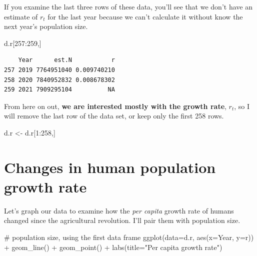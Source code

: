 \documentclass[
  letterpaper,
  DIV=11,
  numbers=noendperiod]{scrreprt}
\newenvironment{Shaded}{\begin{snugshade}}{\end{snugshade}}
\newcommand{\AttributeTok}[1]{\textcolor[rgb]{0.40,0.45,0.13}{#1}}
\newcommand{\CommentTok}[1]{\textcolor[rgb]{0.37,0.37,0.37}{#1}}
\newcommand{\DecValTok}[1]{\textcolor[rgb]{0.68,0.00,0.00}{#1}}
\newcommand{\FunctionTok}[1]{\textcolor[rgb]{0.28,0.35,0.67}{#1}}
\newcommand{\NormalTok}[1]{\textcolor[rgb]{0.00,0.23,0.31}{#1}}
\newcommand{\OtherTok}[1]{\textcolor[rgb]{0.00,0.23,0.31}{#1}}
\newcommand{\SpecialCharTok}[1]{\textcolor[rgb]{0.37,0.37,0.37}{#1}}
\newcommand{\StringTok}[1]{\textcolor[rgb]{0.13,0.47,0.30}{#1}}
\begin{document}
If you examine the last three rows of these data, you'll see that we
don't have an estimate of \(r_t\) for the last year because we can't
calculate it without know the next year's population size.

\begin{Shaded}
\begin{Highlighting}[]
\NormalTok{d.r[}\DecValTok{257}\SpecialCharTok{:}\DecValTok{259}\NormalTok{,]}
\end{Highlighting}
\end{Shaded}

\begin{verbatim}
    Year      est.N           r
257 2019 7764951040 0.009740210
258 2020 7840952832 0.008678302
259 2021 7909295104          NA
\end{verbatim}

From here on out, \textbf{we are interested mostly with the growth
rate}, \(r_t\), so I will remove the last row of the data set, or keep
only the first 258 rows.

\begin{Shaded}
\begin{Highlighting}[]
\NormalTok{d.r }\OtherTok{\textless{}{-}}\NormalTok{ d.r[}\DecValTok{1}\SpecialCharTok{:}\DecValTok{258}\NormalTok{,]}
\end{Highlighting}
\end{Shaded}

\section{Changes in human population growth
rate}\label{changes-in-human-population-growth-rate}

Let's graph our data to examine how the \emph{per capita} growth rate of
humans changed since the agricultural revolution. I'll pair them with
population size.

\begin{Shaded}
\begin{Highlighting}[]
\CommentTok{\# population size, using the first data frame}
\FunctionTok{ggplot}\NormalTok{(}\AttributeTok{data=}\NormalTok{d.r, }\FunctionTok{aes}\NormalTok{(}\AttributeTok{x=}\NormalTok{Year, }\AttributeTok{y=}\NormalTok{r)) }\SpecialCharTok{+} \FunctionTok{geom\_line}\NormalTok{() }\SpecialCharTok{+}
  \FunctionTok{geom\_point}\NormalTok{() }\SpecialCharTok{+} \FunctionTok{labs}\NormalTok{(}\AttributeTok{title=}\StringTok{"Per capita growth rate"}\NormalTok{)}
\end{Highlighting}
\end{Shaded}
\end{document}
